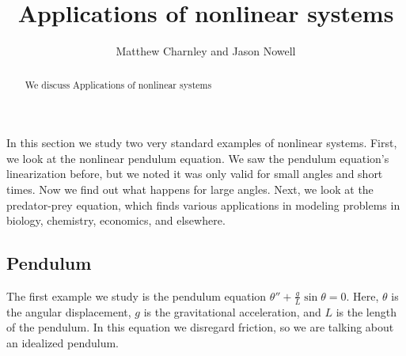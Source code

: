 \documentclass{ximera}
\title{Applications of nonlinear systems}
\author{Matthew Charnley and Jason Nowell}
\begin{document}
\begin{abstract}
    We discuss Applications of nonlinear systems
\end{abstract}
\maketitle


\label{nlinapps:section}

In this section we study two very standard examples of nonlinear systems.  First, we look at the nonlinear pendulum equation.  We saw the pendulum equation's linearization before, but we noted it was only valid for small angles and short times.  Now we find out what happens for large angles.  Next, we look at the predator-prey equation, which finds various applications in modeling problems in biology, chemistry, economics, and elsewhere.

\subsection{Pendulum}

The first example we study is the pendulum equation $\theta''+\frac{g}{L} \sin \theta = 0$.  Here, $\theta$ is the angular displacement, $g$ is the gravitational acceleration, and $L$ is the length of the pendulum.  In this equation we disregard friction, so we are talking about an idealized pendulum.
\end{document}
